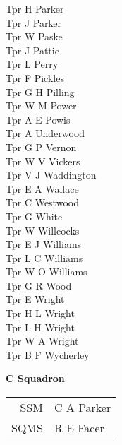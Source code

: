 \begin{multicols}{2}
  Tpr H Parker \\
  Tpr J Parker \\
  Tpr W Paske \\
  Tpr J Pattie \\
  Tpr L Perry \\
  Tpr F Pickles \\
  Tpr G H Pilling \\
  Tpr W M Power \\
  Tpr A E Powis \\
  Tpr A Underwood \\
  Tpr G P Vernon \\
  Tpr W V Vickers \\
  Tpr V J Waddington \\
  Tpr E A Wallace \\
  Tpr C Westwood \\
  Tpr G White \\
  Tpr W Willcocks \\
  Tpr E J Williams \\
  Tpr L C Williams \\
  Tpr W O Williams \\
  Tpr G R Wood \\
  Tpr E Wright \\
  Tpr H L Wright \\
  Tpr L H Wright \\
  Tpr W A Wright \\
  Tpr B F Wycherley \\
\end{multicols}

\begin{center}
  \Large
  \textbf{C Squadron}
\end{center}

\begin{center}
  \begin{tabular}{rl}
    SSM & C A Parker \\
    SQMS & R E Facer \\
  \end{tabular}
\end{center}

